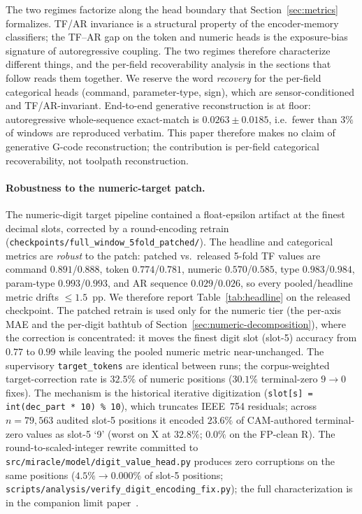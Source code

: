 \documentclass[sensors,article,submit,moreauthors,pdftex]{Definitions/mdpi}
\begin{document}
The two regimes factorize along the head boundary that Section~\ref{sec:metrics} formalizes. TF/AR invariance is a structural property of the encoder-memory classifiers; the TF--AR gap on the token and numeric heads is the exposure-bias signature of autoregressive coupling. The two regimes therefore characterize different things, and the per-field recoverability analysis in the sections that follow reads them together. We reserve the word \emph{recovery} for the per-field categorical heads (command, parameter-type, sign), which are sensor-conditioned and TF/AR-invariant. End-to-end generative reconstruction is at floor: autoregressive whole-sequence exact-match is $0.0263 \pm 0.0185$, i.e.\ fewer than $3\%$ of windows are reproduced verbatim. This paper therefore makes no claim of generative G-code reconstruction; the contribution is per-field categorical recoverability, not toolpath reconstruction.

\paragraph{Robustness to the numeric-target patch.} The numeric-digit target pipeline contained a float-epsilon artifact at the finest decimal slots, corrected by a round-encoding retrain (\texttt{checkpoints/full\_window\_5fold\_patched/}). The headline and categorical metrics are \emph{robust} to the patch: patched vs.\ released 5-fold TF values are command $0.891$/$0.888$, token $0.774$/$0.781$, numeric $0.570$/$0.585$, type $0.983$/$0.984$, param-type $0.993$/$0.993$, and AR sequence $0.029$/$0.026$, so every pooled/headline metric drifts $\le\!1.5$~pp. We therefore report Table~\ref{tab:headline} on the released checkpoint. The patched retrain is used only for the numeric tier (the per-axis MAE and the per-digit bathtub of Section~\ref{sec:numeric-decomposition}), where the correction is concentrated: it moves the finest digit slot (slot-5) accuracy from $0.77$ to $0.99$ while leaving the pooled numeric metric near-unchanged. The supervisory \texttt{target\_tokens} are identical between runs; the corpus-weighted target-correction rate is $32.5\%$ of numeric positions ($30.1\%$ terminal-zero $9\!\to\!0$ fixes). The mechanism is the historical iterative digitization (\texttt{slot[s] = int(dec\_part * 10) \% 10}), which truncates IEEE~754 residuals; across $n\!=\!79{,}563$ audited slot-5 positions it encoded $23.6\%$ of CAM-authored terminal-zero values as slot-5 `9' (worst on X at $32.8\%$; $0.0\%$ on the FP-clean R). The round-to-scaled-integer rewrite committed to \texttt{src/miracle/model/digit\_value\_head.py} produces zero corruptions on the same positions ($4.5\%\!\to\!0.000\%$ of slot-5 positions; \texttt{scripts/analysis/verify\_digit\_encoding\_fix.py}); the full characterization is in the companion limit paper~\cite{paperB_entropy}.
\end{document}
